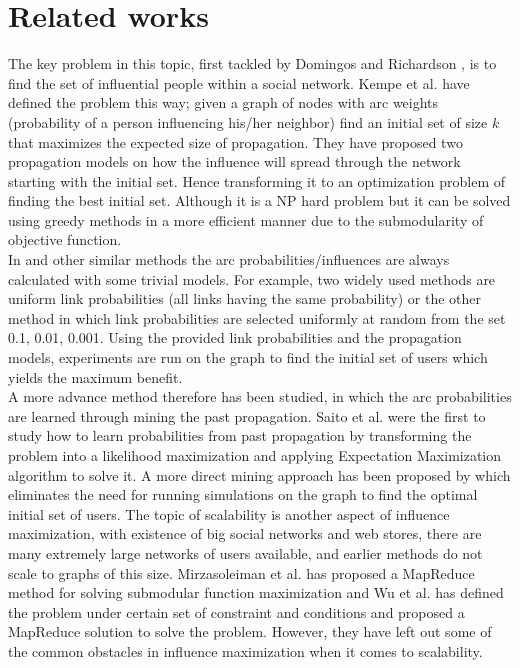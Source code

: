 \documentclass[english]{tktltiki}
\begin{document}
\section{Related works}
The key problem in this topic, first tackled by Domingos and Richardson \cite{domingo01}, is to find the set of influential people within a social network. 
Kempe et al. \cite{kempe03} have defined the problem this way; given a graph of nodes with arc weights (probability of a person influencing his/her neighbor) find an initial set of size $k$ that maximizes the expected size of propagation. They have  proposed two propagation models on how the influence will spread through the network starting with the initial set. Hence transforming it to an optimization problem of finding the best initial set. Although it is a NP hard problem but it can be solved using greedy methods in a more efficient manner due to the submodularity of objective function. \\
In \cite{kempe03} and other similar methods the arc probabilities/influences are always calculated with some trivial models. For example, two widely used methods are uniform link probabilities (all links having the same probability) or the other method in which link probabilities are selected uniformly at random from the set {0.1, 0.01, 0.001}. Using the provided link probabilities and the propagation models, experiments are run on the graph to find the initial set of users which yields the maximum benefit.  \\
A more advance method therefore has been studied, in which the arc probabilities are learned through mining the past propagation. Saito et al. \cite{saito08} were the first to study how to learn probabilities from past propagation by transforming the problem into a likelihood maximization and applying Expectation Maximization algorithm to solve it. A more direct mining approach has been proposed by \cite{goyal11} which eliminates the need for running simulations on the graph to find the optimal initial set of users. 
The topic of scalability is another aspect of influence maximization, with existence of big social networks and web stores, there are many extremely large networks of users available, and earlier methods do not scale to graphs of this size. Mirzasoleiman et al. \cite{mks13} has proposed a MapReduce method for solving submodular function maximization and Wu et al. \cite{WYH13} has defined the problem under certain set of constraint and conditions and proposed a MapReduce solution to solve the problem. However, they have left out some of the common obstacles in influence maximization when it comes to scalability. 
\end{document}
